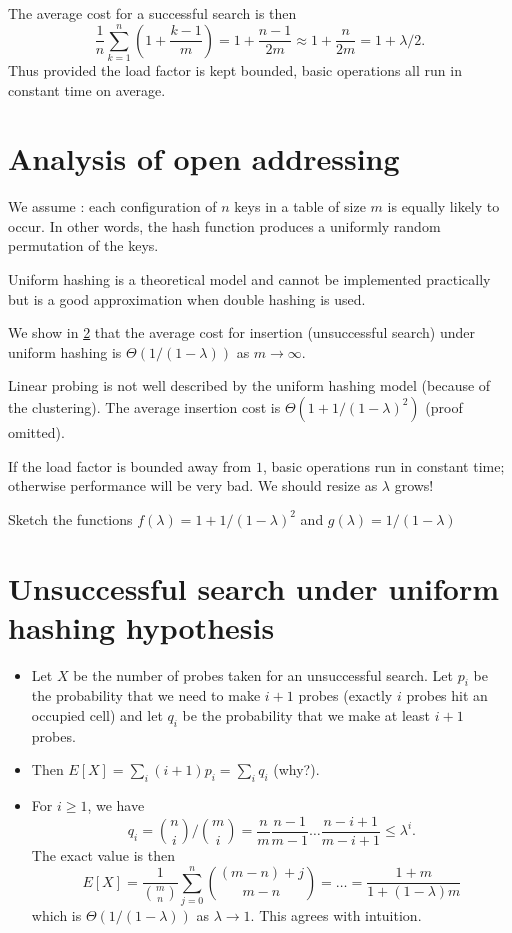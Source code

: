 The average cost for a successful search is then 
$$
\frac{1}{n}   \sum_{k=1}^n (1+\frac{k-1}{m}) = 1+ \frac{n-1}{2m} \approx 1+ \frac{n}{2m}  = 1+ \lambda/2 \text{.}
$$
Thus provided the load factor is kept bounded, basic operations all run in 
constant time on average. 

\section{Analysis of open addressing}
We assume : each configuration of 
$n$ keys in a table of size $m$ is equally likely to occur. In other words, the 
hash function produces a uniformly random permutation of the keys.

Uniform hashing is a theoretical model and cannot be implemented practically but is a good approximation when double hashing is used.

We show in \cref{sec:hashinsert} that the average cost for insertion (unsuccessful search) under uniform hashing  
 is $\Theta(1/(1-\lambda))$ as $m \to \infty$.

Linear probing is not well described by the uniform hashing model 
(because of the clustering). The average insertion cost is $\Theta(1 + 1/(1 - \lambda)^2)$ (proof omitted).

If the load factor is bounded away from $1$, basic operations 
run in constant time; otherwise performance will be very bad. We should resize as $\lambda$ grows!

\begin{Boxample}[9]
Sketch the functions $f(\lambda) = 1+1/(1 - \lambda)^2$ and $g(\lambda) = 1/(1 - \lambda)$
\end{Boxample}

\section{Unsuccessful search under uniform hashing hypothesis}
\label{sec:hashinsert}
\begin{itemize}
\item Let $X$ be the number of probes taken for an unsuccessful search. 
Let $p_i$ be the probability that we need to make $i+1$ probes 
(exactly $i$ probes hit an occupied cell) and let $q_i$ be the probability 
that we make at least $i+1$ probes. 
\item Then 
$E[X] = \sum_i (i+1) p_i = \sum_i q_i$ (why?).
\item For $i \geq 1$, we have
$$ q_i = \binom{n}{i}/\binom{m}{i} = \frac{n}{m} \frac{n-1}{m-1} 
\dots \frac{n - i + 1}{m - i + 1}  \leq \lambda^i\text{.}$$
The exact value is then
$$
E[X] = \frac{1}{\binom{m}{n}} \sum_{j=0}^n \binom{(m-n)+j}{m-n} = 
\dots = \frac{1+m}{1+(1-\lambda)m}
$$
which is $\Theta(1/(1 - \lambda))$ as $\lambda \to 1$. This agrees with 
intuition.
\end{itemize}


